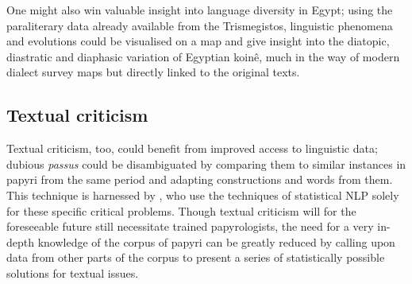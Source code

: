 One might also win valuable insight into language diversity in Egypt;
using the paraliterary data already available from the Trismegistos,
linguistic phenomena and evolutions could be visualised on a map and
give insight into the diatopic, diastratic and diaphasic variation of
Egyptian koin\^e, much in the way of modern dialect survey maps but
directly linked to the original texts.

\subsection{Textual criticism}
\label{sec:textualcriticism}
Textual criticism, too, could benefit from improved access to
linguistic data; dubious \textit{passus} could be disambiguated by
comparing them to similar instances in papyri from the same period and
adapting constructions and words from them.  This technique is
harnessed by \cite{mimno2009}, who use the techniques of statistical
NLP solely for these specific critical problems.  Though textual
criticism will for the foreseeable future still necessitate trained
papyrologists, the need for a very in-depth knowledge of the corpus of
papyri can be greatly reduced by calling upon data from other parts of
the corpus to present a series of statistically possible solutions for
textual issues.